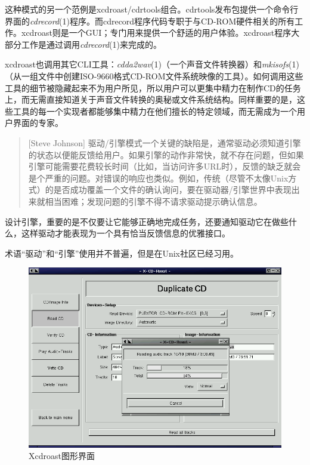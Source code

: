 \documentclass[12pt,oneside]{book}
\begin{document}
这种模式的另一个范例是xcdroast/cdrtools组合。cdrtools发布包提供一个命令行界面的\textit{cdrecord}(1)程序。而cdrecord程序代码专职于与CD-ROM硬件相关的所有工作。xcdroast则是一个GUI；专门用来提供一个舒适的用户体验。xcdroast程序大部分工作是通过调用\textit{cdrecord}(1)来完成的。

xcdroast也调用其它CLI工具：\textit{cdda2wav}(1)（一个声音文件转换器）和\textit{mkisofs}(1)（从一组文件中创建ISO-9660格式CD-ROM文件系统映像的工具）。如何调用这些工具的细节被隐藏起来不为用户所见，所以用户可以更集中精力在制作CD的任务上，而无需直接知道关于声音文件转换的奥秘或文件系统结构。同样重要的是，这些工具的每一个实现者都能够集中精力在他们擅长的特定领域，而无需成为一个用户界面的专家。

\begin{quote}[Steve Johnson]
驱动/引擎模式一个关键的缺陷是，通常驱动必须知道引擎的状态以便能反馈给用户。如果引擎的动作非常快，就不存在问题，但如果引擎可能需要花费较长时间（比如，当访问许多URL时），反馈的缺乏就会是个严重的问题。对错误的响应也类似。例如，传统（尽管不太像Unix方式）的是否成功覆盖一个文件的确认询问，要在驱动器/引擎世界中表现出来就相当困难；发现问题的引擎不得不请求驱动提示确认信息。
\end{quote}

设计引擎，重要的是不仅要让它能够正确地完成任务，还要通知驱动它在做些什么，这样驱动才能表现为一个具有恰当反馈信息的优雅接口。

术语“驱动”和“引擎”使用并不普遍，但是在Unix社区已经习用。

\begin{figure}[H]
\centering
\includegraphics[width=\linewidth ,totalheight=0.95\textheight , keepaspectratio]{xcdr-read.png}
\caption{Xcdroast图形界面}
\end{figure}
\end{document}
